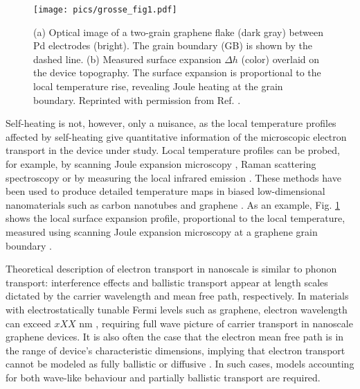 \begin{figure}
\begin{center}
 \texttt{[image: pics/grosse\_fig1.pdf]}
 \caption{(a) Optical image of a two-grain graphene flake (dark gray) between Pd electrodes (bright). The grain boundary (GB) is shown by the dashed line. (b) Measured surface expansion $\Delta h$ (color) overlaid on the device topography. The surface expansion is proportional to the local temperature rise, revealing Joule heating at the grain boundary. Reprinted with permission from Ref. \cite{grosse14}.}
\label{fig:intro_grosse}
\end{center}
\end{figure} 

Self-heating is not, however, only a nuisance, as the local temperature profiles affected by self-heating give quantitative information of the microscopic electron transport in the device under study. Local temperature profiles can be probed, for example, by scanning Joule expansion microscopy \cite{varesi98}, Raman scattering spectroscopy \cite{calizo07} or by measuring the local infrared emission \cite{bae10}. These methods have been used to produce detailed temperature maps in biased low-dimensional nanomaterials such as carbon nanotubes \cite{estrada11,xie12} and graphene \cite{bae10,freitag09,chae10,freitag10}. As an example, Fig. \ref{fig:intro_grosse} shows the local surface expansion profile, proportional to the local temperature, measured using scanning Joule expansion microscopy at a graphene grain boundary \cite{grosse14}.

Theoretical description of electron transport in nanoscale is similar to phonon transport: interference effects and ballistic transport appear at length scales dictated by the carrier wavelength and mean free path, respectively. In materials with electrostatically tunable Fermi levels such as graphene, electron wavelength can exceed $xXX$ nm \cite{}, requiring full wave picture of carrier transport in nanoscale graphene devices. It is also often the case that the electron mean free path is in the range of device's characteristic dimensions, implying that electron transport cannot be modeled as fully ballistic or diffusive \cite{}. In such cases, models accounting for both wave-like behaviour and partially ballistic transport are required. 


